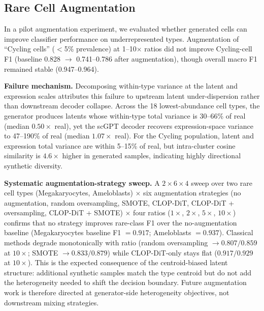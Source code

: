 \documentclass[11pt,a4paper]{article}
\begin{document}
\subsection{Rare Cell Augmentation}\label{sec:rare-cell}

In a pilot augmentation experiment, we evaluated whether generated cells can improve classifier performance on underrepresented types. Augmentation of ``Cycling cells'' ($<$5\% prevalence) at 1--10$\times$ ratios did not improve Cycling-cell F1 (baseline 0.828 $\to$ 0.741--0.786 after augmentation), though overall macro F1 remained stable (0.947--0.964).

\textbf{Failure mechanism.} Decomposing within-type variance at the latent and expression scales attributes this failure to upstream latent under-dispersion rather than downstream decoder collapse. Across the 18 lowest-abundance cell types, the generator produces latents whose within-type total variance is 30--66\% of real (median $0.50\times$ real), yet the scGPT decoder recovers expression-space variance to 47--190\% of real (median $1.07\times$ real). For the Cycling population, latent and expression total variance are within 5--15\% of real, but intra-cluster cosine similarity is $4.6\times$ higher in generated samples, indicating highly directional synthetic diversity.

\textbf{Systematic augmentation-strategy sweep.} A $2\times 6\times 4$ sweep over two rare cell types (Megakaryocytes, Ameloblasts) $\times$ six augmentation strategies (no augmentation, random oversampling, SMOTE, CLOP-DiT, CLOP-DiT + oversampling, CLOP-DiT + SMOTE) $\times$ four ratios ($1\times$, $2\times$, $5\times$, $10\times$) confirms that no strategy improves rare-class F1 over the no-augmentation baseline (Megakaryocytes baseline F1 $= 0.917$; Ameloblasts $= 0.937$). Classical methods degrade monotonically with ratio (random oversampling $\to 0.807/0.859$ at $10\times$; SMOTE $\to 0.833/0.879$) while CLOP-DiT-only stays flat ($0.917/0.929$ at $10\times$). This is the expected consequence of the centroid-biased latent structure: additional synthetic samples match the type centroid but do not add the heterogeneity needed to shift the decision boundary. Future augmentation work is therefore directed at generator-side heterogeneity objectives, not downstream mixing strategies.
\end{document}

